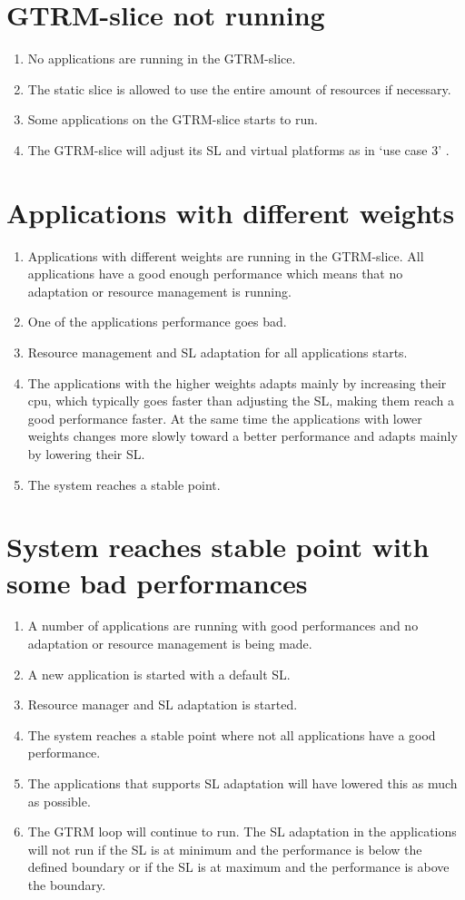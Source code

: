 \documentclass{LTHthesis}
\begin{document}
\section{GTRM-slice not running}
\begin{enumerate}
\item No applications are running in the GTRM-slice.
\item The static slice is allowed to use the entire amount of resources if necessary.
\item Some applications on the GTRM-slice starts to run.
\item The GTRM-slice will adjust its SL and virtual platforms as in ‘use case 3’ .
\end{enumerate}

\section{Applications with different weights}
\begin{enumerate}
\item Applications with different weights are running in the GTRM-slice. All applications have a good enough performance which means that no adaptation or resource management is running. 
\item One of the applications performance goes bad.
\item Resource management and SL adaptation for all applications starts.
\item The applications with the higher weights adapts mainly by increasing their cpu, which typically goes faster than adjusting the SL, making them reach a good performance faster. At the same time the applications with lower weights changes more slowly toward a better performance and adapts mainly by lowering their SL.
\item The system reaches a stable point.
\end{enumerate}

\section{System reaches stable point with some bad performances}
\begin{enumerate}
\item A number of applications are running with good performances and no adaptation or resource management is being made.
\item A new application is started with a default SL.
\item Resource manager and SL adaptation is started.
\item The system reaches a stable point where not all applications have a good performance. 
\item The applications that supports SL adaptation will have lowered this as much as possible.
\item The GTRM loop will continue to run. The SL adaptation in the applications will not run if the SL is at minimum and the performance is below the defined boundary or if the SL is at maximum and the performance is above the boundary.
\end{enumerate}
\end{document}
